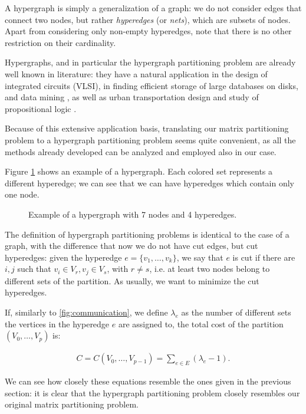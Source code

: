 A hypergraph is simply a generalization of a graph: we do not consider edges that connect two nodes, but rather \emph{hyperedges} (or \emph{nets}), which are subsets of nodes. Apart from considering only non-empty hyperedges, note that there is no other restriction on their cardinality.

Hypergraphs, and in particular the hypergraph partitioning problem are already well known in literature: they have a natural application in the design of integrated circuits (VLSI), in finding efficient storage of large databases on disks, and data mining \cite{vlsi}, as well as urban transportation design and study of propositional logic \cite{papa_hypergraph}.

Because of this extensive application basis, translating our matrix partitioning problem to a hypergraph partitioning problem seems quite convenient, as all the methods already developed can be analyzed and employed also in our case.

Figure \ref{fig:hypergraph} shows an example of a hypergraph. Each colored set represents a different hyperedge; we can see that we can have hyperedges which contain only one node.

\begin{figure}[h]
	\centering
	\caption{Example of a hypergraph with 7 nodes and 4 hyperedges.}
	\label{fig:hypergraph}
\end{figure}

The definition of hypergraph partitioning problems is identical to the case of a graph, with the difference that now we do not have cut edges, but cut hyperedges: given the hyperedge $e=\{v_1,\dots,v_k\}$, we say that $e$ is cut if there are $i,j$ such that $v_i \in V_r, v_j \in V_s$, with $r \neq s$, i.e. at least two nodes belong to different sets of the partition. As usually, we want to minimize the cut hyperedges.

If, similarly to \eqref{fig:communication}, we define $\lambda_e$ as the number of different sets the vertices in the hyperedge $e$ are assigned to, the total cost of the partition $(V_0,\dots,V_p)$ is:

\begin{align}
	C = C(V_0,\dots,V_{p-1}) = \sum_{e \in E} (\lambda_e -1).
	\label{eq:cost_hypergraph}
\end{align}

We can see how closely these equations resemble the ones given in the previous section: it is clear that the hypergraph partitioning problem closely resembles our original matrix partitioning problem.

